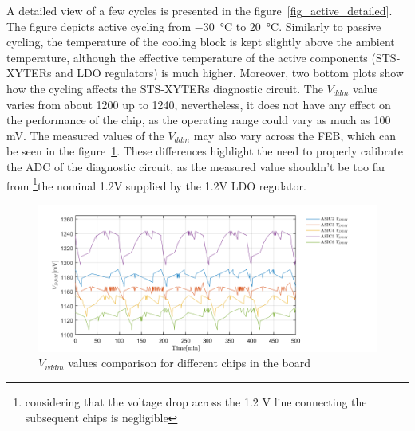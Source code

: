 A detailed view of a few cycles is presented in the figure~\ref{fig_active_detailed}. The figure depicts active cycling from \SI{-30}{\celsius} to \SI{20}{\celsius}. Similarly to passive cycling, the temperature of the cooling block is kept slightly above the ambient temperature, although the effective temperature of the active components (STS-XYTERs and \gls{LDO} regulators) is much higher. Moreover, two bottom plots show how the cycling affects the \gls{STS}-XYTERs diagnostic circuit. The $V_{ddm}$ value varies from about 1200 up to 1240, nevertheless, it does not have any effect on the performance of the chip, as the operating range could vary as much as 100 mV. The measured values of the $V_{ddm}$ may also vary across the \gls{FEB}, which can be seen in the figure~\ref{feb_vary}. These differences highlight the need to properly calibrate the ADC of the diagnostic circuit, as the measured value shouldn't be too far from \footnote{considering that the voltage drop across the 1.2 V line connecting the subsequent chips is negligible}{the nominal 1.2V} supplied by the 1.2V \gls{LDO} regulator. 
\begin{figure}[!h]
\centering
\includegraphics[width=0.9\columnwidth]{Chapter4/images/vddm_comp.png}
\caption{$V_{vddm}$ values comparison for different chips in the board}
\label{feb_vary}
\end{figure}

